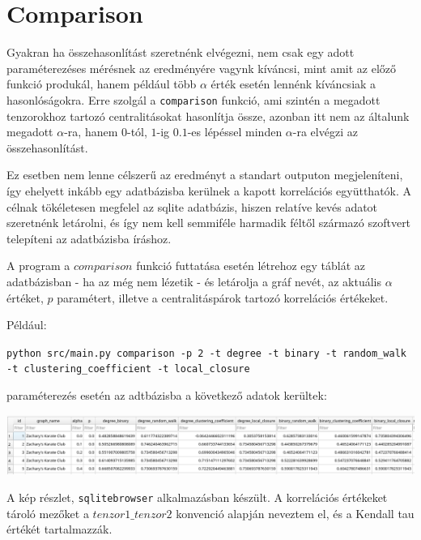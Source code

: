 \documentclass[12pt,numbers=noenddot]{report}
\begin{document}
\section{Comparison}

Gyakran ha összehasonlítást szeretnénk elvégezni, nem csak egy adott 
paraméterezéses mérésnek az eredményére vagynk kíváncsi, mint amit az előző
funkció produkál, hanem például több $\alpha$ érték esetén lennénk kíváncsiak
a hasonlóságokra. Erre szolgál a \texttt{comparison} funkció, ami szintén 
a megadott tenzorokhoz tartozó centralitásokat hasonlítja össze, azonban itt 
nem az általunk megadott $\alpha$-ra, hanem $0$-tól, $1$-ig $0.1$-es lépéssel
minden $\alpha$-ra elvégzi az összehasonlítást.

Ez esetben nem lenne célszerű az eredményt a standart outputon megjeleníteni,
így ehelyett inkább egy adatbázisba kerülnek a kapott korrelációs együtthatók.
A célnak tökéletesen megfelel az sqlite adatbázis, hiszen relatíve kevés 
adatot szeretnénk letárolni, és így nem kell semmiféle harmadik féltől 
származó szoftvert telepíteni az adatbázisba íráshoz.

A program a $comparison$ funkció futtatása esetén létrehoz egy táblát az 
adatbázisban - ha az még nem lézetik - és letárolja a gráf nevét, az aktuális 
$\alpha$ értéket, $p$ paramétert, illetve a centralitáspárok tartozó korrelációs
értékeket.

\vspace{0.3cm}

\noindent
Például:

\texttt{python src/main.py comparison -p 2 -t degree -t binary -t random\_walk -t clustering\_coefficient -t local\_closure}

\noindent
paraméterezés esetén az adtbázisba a következő adatok kerültek:

\vspace{0.3cm}

\noindent
\includegraphics[width=\linewidth]{images/comparison_result.png}

\noindent
A kép részlet, \texttt{sqlitebrowser} alkalmazásban készült.
A korrelációs értékeket tároló mezőket a $tenzor1\_tenzor2$ konvenció alapján 
neveztem el, és a Kendall tau értékét tartalmazzák.

\pagebreak
\end{document}
